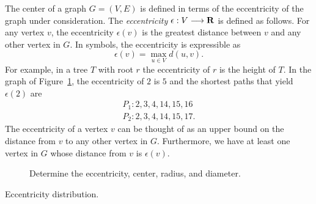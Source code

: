 The center of a graph $G = (V,E)$ is defined in terms of the
eccentricity of the graph under consideration. The
\emph{eccentricity}
$\epsilon: V \longrightarrow \mathbf{R}$\index{$\epsilon$} is defined as follows. For any
vertex $v$, the eccentricity $\epsilon(v)$ is the greatest distance
between $v$ and any other vertex in $G$. In symbols, the eccentricity
is expressible as
\[
\epsilon(v)
=
\max_{u \in V} d(u,v).
\]
For example, in a tree $T$ with root $r$ the eccentricity of $r$ is
the height of $T$. In the graph of
Figure~\ref{fig:distance_connectivity:find_eccentricity_center_radius_diameter},
the eccentricity of $2$ is $5$ and the shortest paths that yield
$\epsilon(2)$ are
\begin{align*}
P_1: 2, 3, 4, 14, 15, 16 \\
P_2: 2, 3, 4, 14, 15, 17.
\end{align*}
The eccentricity of a vertex $v$ can be thought of as an upper bound
on the distance from $v$ to any other vertex in $G$. Furthermore, we
have at least one vertex in $G$ whose distance from $v$ is
$\epsilon(v)$.

\begin{figure}[!htbp]
\centering

\caption{Determine the eccentricity, center, radius, and diameter.}
\label{fig:distance_connectivity:find_eccentricity_center_radius_diameter}
\end{figure}

\begin{table}[!htbp]
\centering

\caption{Eccentricity distribution.}
\label{tab:distance_connectivity:eccentricity_distribution}
\end{table}

